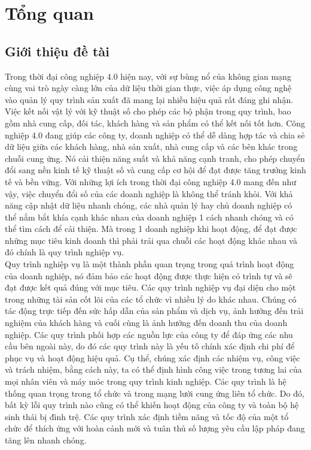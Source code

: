 \section{Tổng quan}
\subsection{Giới thiệu đề tài}

\hspace{0.5cm}Trong thời đại công nghiệp 4.0 hiện nay, với sự bùng nổ của không gian mạng cùng vai trò ngày càng lớn của dữ liệu thời gian thực, việc áp dụng công nghệ vào quản lý quy trình sản xuất đã mang lại nhiều hiệu quả rất đáng ghi nhận. Việc kết nối vật lý với kỹ thuật số cho phép các bộ phận trong quy trình, bao gồm nhà cung cấp, đối tác, khách hàng và sản phẩm có thể kết nối tốt hơn. Công nghiệp 4.0 đang giúp các công ty, doanh nghiệp có thể dễ dàng hợp tác và chia sẻ dữ liệu giữa các khách hàng, nhà sản xuất, nhà cung cấp và các bên khác trong chuỗi cung ứng. Nó cải thiện năng suất và khả năng cạnh tranh, cho phép chuyển đổi sang nền kinh tế kỹ thuật số và cung cấp cơ hội để đạt được tăng trưởng kinh tế và bền vững. Với những lợi ích trong thời đại công nghiệp 4.0 mang đến như vậy, việc chuyển đổi số của các doanh nghiệp là không thể tránh khỏi. Với khả năng cập nhật dữ liệu nhanh chóng, các nhà quản lý hay chủ doanh nghiệp có thể nắm bắt khía cạnh khác nhau của doanh nghiệp 1 cách nhanh chóng và có thể tìm cách để cải thiện. Mà trong 1 doanh nghiệp khi hoạt động, để đạt được những mục tiêu kinh doanh thì phải trải qua chuỗi các hoạt động khác nhau và đó chính là quy trình nghiệp vụ.\\

Quy trình nghiệp vụ là một thành phần quan trọng trong quá trình hoạt động của doanh nghiệp, nó đảm bảo các hoạt động được thực hiện có trình tự và sẽ đạt được kết quả đúng với mục tiêu. Các quy trình nghiệp vụ đại diện cho một trong những tài sản cốt lõi của các tổ chức vì nhiều lý do khác nhau. Chúng có tác động trực tiếp đến sức hấp dẫn của sản phẩm và dịch vụ, ảnh hưởng đến trải nghiệm của khách hàng và cuối cùng là ảnh hưởng đến doanh thu của doanh nghiệp. Các quy trình phối hợp các nguồn lực của công ty để đáp ứng các nhu cầu bên ngoài này, do đó các quy trình này là yếu tố chính xác định chi phí để phục vụ và hoạt động hiệu quả. Cụ thể, chúng xác định các nhiệm vụ, công việc và trách nhiệm, bằng cách này, ta có thể định hình công việc trong tương lai của mọi nhân viên và máy móc trong quy trình kinh nghiệp. Các quy trình là hệ thống quan trọng trong tổ chức và trong mạng lưới cung ứng liên tổ chức. Do đó, bất kỳ lỗi quy trình nào cũng có thể khiến hoạt động của công ty và toàn bộ hệ sinh thái bị đình trệ. Các quy trình xác định tiềm năng và tốc độ của một tổ chức để thích ứng với hoàn cảnh mới và tuân thủ số lượng yêu cầu lập pháp đang tăng lên nhanh chóng.\\


